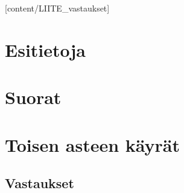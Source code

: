 [content/LIITE_vastaukset]

\chapter{Esitietoja}
	
	\newpage 
	\newpage 
	\newpage 

\chapter{Suorat}
	
	\newpage 
	\newpage 
	\newpage 

\chapter{Toisen asteen käyrät}
	
	\newpage 
	\newpage 
	\newpage 
	\newpage 
	\newpage 
	\newpage 


\liitetyyli

\section{Vastaukset} 

\newpage 
\newpage 

\newpage 
\newpage 
\newpage 
\newpage 
\newpage 
